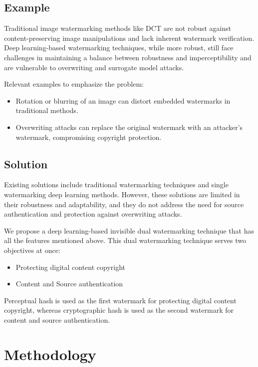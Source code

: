 \documentclass[acmsmall, nonacm]{acmart}
\begin{document}
\subsection{Example}\label{subsec:example}

Traditional image watermarking methods like DCT are not robust against
content-preserving image manipulations and lack inherent watermark
verification. Deep learning-based watermarking techniques, while more
robust, still face challenges in maintaining a balance between
robustness and imperceptibility and are vulnerable to overwriting and
surrogate model attacks.

Relevant examples to emphasize the problem:

\begin{itemize}
  \item Rotation or blurring of an image can distort embedded watermarks in
        traditional methods.
  \item Overwriting attacks can replace the original
        watermark with an attacker's watermark, compromising copyright
        protection.
\end{itemize}

\subsection{Solution}\label{subsec:solution}

Existing solutions include traditional watermarking techniques and
single watermarking deep learning methods. However, these solutions are
limited in their robustness and adaptability, and they do not address
the need for source authentication and protection against overwriting
attacks.

We propose a deep learning-based invisible dual watermarking technique that has all the features mentioned above.  This dual watermarking technique serves two objectives at once:

\begin{itemize}
  \item Protecting digital content copyright
  \item Content and Source authentication
\end{itemize}

Perceptual hash is used as the first watermark for protecting digital content copyright, whereas cryptographic hash is used as the second watermark for content and source authentication.

\section{Methodology}\label{sec:methodology}
\end{document}
